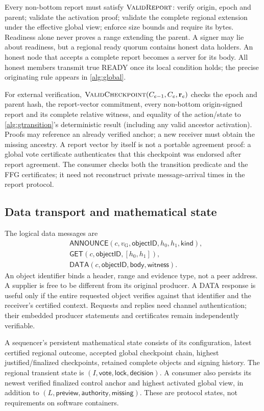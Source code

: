\documentclass[11pt,a4paper,onecolumn]{article}
\newcommand{\gv}{v_{\mathrm G}}
\newcommand{\Tag}[1]{\mathsf{#1}}
\newcommand{\Proc}[1]{\textnormal{\textsc{#1}}}
\theoremstyle{remark}\newtheorem{example}[definition]{Example}
\newcounter{protocol}
\begin{document}
Every non-bottom report must satisfy $\Proc{ValidReport}$: verify origin,
epoch and parent; validate the activation proof; validate the complete regional
extension under the effective global view; enforce size bounds and require its
bytes. Readiness alone never proves a range extending the parent. A signer may
lie about readiness, but a regional ready quorum contains honest data holders.
An honest node that accepts a complete report becomes a server for its body.
All honest members transmit true READY once its local condition holds; the
precise originating rule appears in \cref{alg:global}.

For external verification, $\Proc{ValidCheckpoint}(C_{e-1},C_e,\mathbf r_e)$
checks the epoch and parent hash, the report-vector commitment, every non-bottom
origin-signed report and its complete relative witness, and equality of the
action/state to \cref{alg:gtransition}'s deterministic result (including any
valid ancestor activation). Proofs may reference an already verified anchor;
a new receiver must obtain the missing ancestry. A report vector by itself is
not a portable agreement proof: a global vote certificate authenticates that
this checkpoint was endorsed after report agreement. The consumer checks both
the transition predicate and the FFG certificates; it need not reconstruct
private message-arrival times in the report protocol.

\subsection{Data transport and mathematical state}\label{sec:transport}
The logical data messages are
\begin{align*}
 &\Tag{ANNOUNCE}(c,\gv,\mathsf{objectID},h_0,h_1,\mathsf{kind}),\\
 &\Tag{GET}(c,\mathsf{objectID},[h_0,h_1]),\\
 &\Tag{DATA}(c,\mathsf{objectID},\mathsf{body},\mathsf{witness}).
\end{align*}
An object identifier binds a header, range and evidence type, not a peer address.
A supplier is free to be different from its original producer. A DATA response
is useful only if the entire requested object verifies against that identifier
and the receiver's certified context. Requests and replies need channel
authentication; their embedded producer statements and certificates remain
independently verifiable.

A sequencer's persistent mathematical state consists of its configuration,
latest certified regional outcome, accepted global checkpoint chain, highest
justified/finalized checkpoints, retained complete objects and signing history.
The regional transient state is $(I,\mathsf{vote},\mathsf{lock},\mathsf{decision})$.
A consumer also persists its newest verified finalized control anchor and
highest activated global view, in addition to
$(L,\mathsf{preview},\mathsf{authority},\mathsf{missing})$.
These are protocol states, not requirements on software containers.
\end{document}
